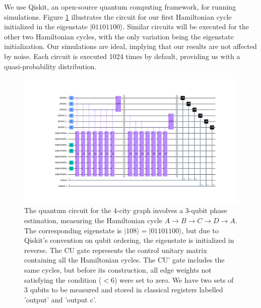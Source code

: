 \documentclass[msc,oneside]{ubcthesis}
\begin{document}
	We use Qiskit, an open-source quantum computing framework, for running simulations. Figure \ref{fig:4-city-circuit} illustrates the circuit for our first Hamiltonian cycle initialized in the eigenstate $|01101100\rangle$. Similar circuits will be executed for the other two Hamiltonian cycles, with the only variation being the eigenstate initialization. Our simulations are ideal, implying that our results are not affected by noise. Each circuit is executed 1024 times by default, providing us with a quasi-probability distribution.
	


 \begin{figure}[!h]
		\centering
		\includegraphics[trim={8.5cm 4.4cm 6cm 4.4cm},clip, width=1 \linewidth]{"graphics/4-city-1-cycle-constrained-barrier"}
		\caption{The quantum circuit for the 4-city graph involves a 3-qubit phase estimation, measuring the Hamiltonian cycle $A \rightarrow B \rightarrow C \rightarrow D \rightarrow A$. The corresponding eigenstate is $|108\rangle = |01101100\rangle$, but due to Qiskit's convention on qubit ordering, the eigenstate is initialized in reverse. The CU gate represents the control unitary matrix containing all the Hamiltonian cycles. The CU' gate includes the same cycles, but before its construction, all edge weights not satisfying the condition ($< 6$) were set to zero. We have two sets of 3 qubits to be measured and stored in classical registers labelled 'output' and 'output c'.}
		\label{fig:4-city-circuit}
	\end{figure}		
\end{document}
